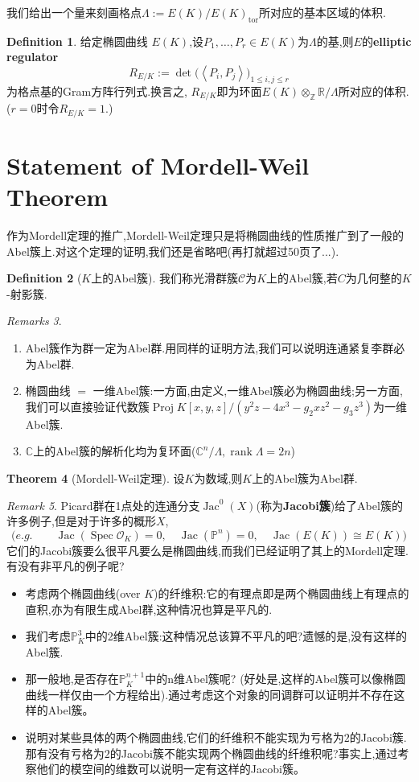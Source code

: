 \documentclass[12pt,A4paper,oneside,reqno]{amsart}
\numberwithin{equation}{section}
\theoremstyle{definition}
\newtheorem{theorem}{Theorem}[section]
\newtheorem{defn}[theorem]{Definition}
\theoremstyle{plain}
\theoremstyle{plain}
\numberwithin{equation}{section}
\theoremstyle{remark}
\newtheorem{remark}[theorem]{Remark}
\newtheorem{remarks}[theorem]{Remarks}
\DeclareMathOperator{\Proj}{\operatorname{Proj}}
\DeclareMathOperator{\rank}{\operatorname{rank}}
\DeclareMathOperator{\tor}{\operatorname{tor}}
\newcommand{\Spec}{\operatorname{Spec}}
\newcommand{\Jac}{\operatorname{Jac}}
\begin{document}
我们给出一个量来刻画格点$\Lambda:=E(K)/E(K)_{\tor}$所对应的基本区域的体积.
\begin{defn}
	给定椭圆曲线 $E(K)$,设$P_1, \ldots ,P_r \in E(K)$为$\Lambda$的基,则$E$的\textbf{elliptic regulator}
	$$R_{E/K}:=\det \big(\left<P_i,P_j\right>\big)_{1 \leqslant i,j \leqslant r}$$
	为格点基的Gram方阵行列式.换言之, $R_{E/K}$即为环面$E(K)\otimes_{\mathbb{Z}}\mathbb{R}/\Lambda$所对应的体积.($r=0$时令$R_{E/K}=1$.)
\end{defn}
\section{Statement of Mordell-Weil Theorem}
作为Mordell定理的推广,Mordell-Weil定理只是将椭圆曲线的性质推广到了一般的Abel簇上.对这个定理的证明,我们还是省略吧(再打就超过50页了...).
\begin{defn}[$K$上的Abel簇]
	我们称光滑群簇$\mathcal{C}$为$K$上的Abel簇,若$C$为几何整的$K$-射影簇.
\end{defn}
\begin{remarks}\
	\begin{enumerate}[1.]
		\item Abel簇作为群一定为Abel群.用同样的证明方法,我们可以说明连通紧复李群必为Abel群.
		\item 椭圆曲线 $=$ 一维Abel簇:一方面,由定义,一维Abel簇必为椭圆曲线;另一方面,我们可以直接验证代数簇$\Proj K[x,y,z]/(y^2z-4x^3-g_2xz^2-g_3z^3)$为一维Abel簇.
		\item $\mathbb{C}$上的Abel簇的解析化均为复环面($\mathbb{C}^n/\Lambda, \rank \Lambda =2n$)
	\end{enumerate}
\end{remarks}
\begin{theorem}[Mordell-Weil定理]
	设$K$为数域,则$K$上的Abel簇为Abel群.
\end{theorem}
\begin{remark}
	Picard群在1点处的连通分支$\Jac^0(X)$(称为\textbf{Jacobi簇})给了Abel簇的许多例子,但是对于许多的概形$X$,
	$$\big(e.g.\qquad\Jac(\Spec \mathcal{O}_K)=0,\quad\Jac(\mathbb{P}^n)=0,\quad\Jac(E(K))\cong E(K)\big)$$
	它们的Jacobi簇要么很平凡要么是椭圆曲线,而我们已经证明了其上的Mordell定理.有没有非平凡的例子呢?
	\begin{itemize}
		\item 考虑两个椭圆曲线(over $K$)的纤维积:它的有理点即是两个椭圆曲线上有理点的直积,亦为有限生成Abel群,这种情况也算是平凡的.
		\item 我们考虑$\mathbb{P}_K^3$中的2维Abel簇:这种情况总该算不平凡的吧?遗憾的是,没有这样的Abel簇.
		\item 那一般地,是否存在$\mathbb{P}_K^{n+1}$中的n维Abel簇呢? (好处是,这样的Abel簇可以像椭圆曲线一样仅由一个方程给出).通过考虑这个对象的同调群可以证明并不存在这样的Abel簇。
		\item \cite{kani2014jacobians}说明对某些具体的两个椭圆曲线,它们的纤维积不能实现为亏格为$2$的Jacobi簇.那有没有亏格为$2$的Jacobi簇不能实现两个椭圆曲线的纤维积呢?事实上,通过考察他们的模空间的维数可以说明一定有这样的Jacobi簇。
	\end{itemize}
\end{remark}
\end{document}
